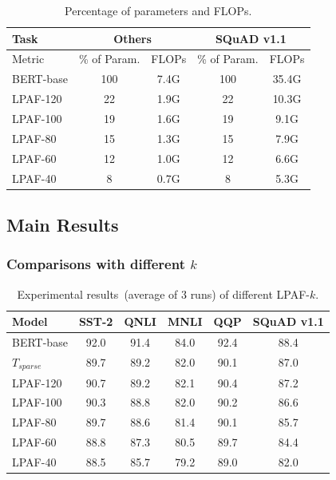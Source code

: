\begin{table}[th]
	\scriptsize
	\centering
	\begin{tabular}{l|cc|cc}
		\toprule
		Task& \multicolumn{2}{c|}{Others} & \multicolumn{2}{c}{SQuAD v1.1} \\
		\midrule
		Metric & \% of Param.           & FLOPs               & \% of Param.      & FLOPs        \\
		\midrule
		BERT-base & 100               & 7.4G                & 100        & 35.4G        \\
		\midrule
		LPAF-120   & 22       & 1.9G          & 22  & 10.3G  \\
		LPAF-100   & 19      & 1.6G          & 19  & 9.1G   \\
		LPAF-80    & 15       & 1.3G          & 15  & 7.9G   \\
		LPAF-60    & 12        & 1.0G         & 12  & 6.6G   \\
		LPAF-40    & 8        & 0.7G        & 8  & 5.3G \\ 
		\bottomrule
	\end{tabular}
	\caption{Percentage of parameters and FLOPs.}
	\label{table:stats}
\end{table}


\subsection{Main Results}
\label{sec:main}
\subsubsection{Comparisons with different $k$}

\begin{table}[h]
	\centering
	\scriptsize
	\begin{tabular}{l|ccccc}
		\toprule
		Model & SST-2 & QNLI & MNLI & QQP  & SQuAD v1.1 \\
		\midrule
		BERT-base &92.0 &91.4 &84.0 &92.4 &88.4 \\
		$T_{sparse}$     & 89.7  & 89.2 & 82.0 & 90.1 & 87.0  \\
		\midrule
		LPAF-120 & 90.7  & 89.2 & 82.1 & 90.4 & 87.2  \\
		LPAF-100 & 90.3  & 88.8 & 82.0 & 90.2 & 86.6  \\
		LPAF-80  & 89.7  & 88.6 & 81.4 & 90.1 & 85.7  \\
		LPAF-60  & 88.8  & 87.3 & 80.5 & 89.7 & 84.4  \\
		LPAF-40  & 88.5  & 85.7 & 79.2 & 89.0 & 82.0 \\
		\bottomrule
	\end{tabular}
	\caption{Experimental results~(average of 3 runs) of different LPAF-$k$.}
	\label{table:diffk}
\end{table}


